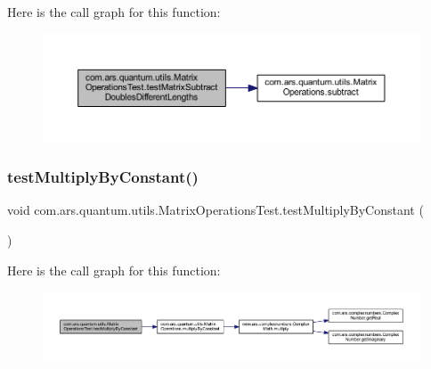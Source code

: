 Here is the call graph for this function\+:\nopagebreak
\begin{figure}[H]
\begin{center}
\leavevmode
\includegraphics[width=350pt]{classcom_1_1ars_1_1quantum_1_1utils_1_1_matrix_operations_test_a5ea063677df577695471228de2a4b6bf_cgraph}
\end{center}
\end{figure}
\hypertarget{classcom_1_1ars_1_1quantum_1_1utils_1_1_matrix_operations_test_a523958e57a1bc8ad1ca05c15cfbaa4d5}{}\label{classcom_1_1ars_1_1quantum_1_1utils_1_1_matrix_operations_test_a523958e57a1bc8ad1ca05c15cfbaa4d5} 
\subsubsection{\texorpdfstring{test\+Multiply\+By\+Constant()}{testMultiplyByConstant()}}
{\footnotesize\ttfamily void com.\+ars.\+quantum.\+utils.\+Matrix\+Operations\+Test.\+test\+Multiply\+By\+Constant (\begin{DoxyParamCaption}{ }\end{DoxyParamCaption})}

Here is the call graph for this function\+:\nopagebreak
\begin{figure}[H]
\begin{center}
\leavevmode
\includegraphics[width=350pt]{classcom_1_1ars_1_1quantum_1_1utils_1_1_matrix_operations_test_a523958e57a1bc8ad1ca05c15cfbaa4d5_cgraph}
\end{center}
\end{figure}
\hypertarget{classcom_1_1ars_1_1quantum_1_1utils_1_1_matrix_operations_test_a531c3daf0534ee2d2776e648f0476ae5}{}\label{classcom_1_1ars_1_1quantum_1_1utils_1_1_matrix_operations_test_a531c3daf0534ee2d2776e648f0476ae5} 
